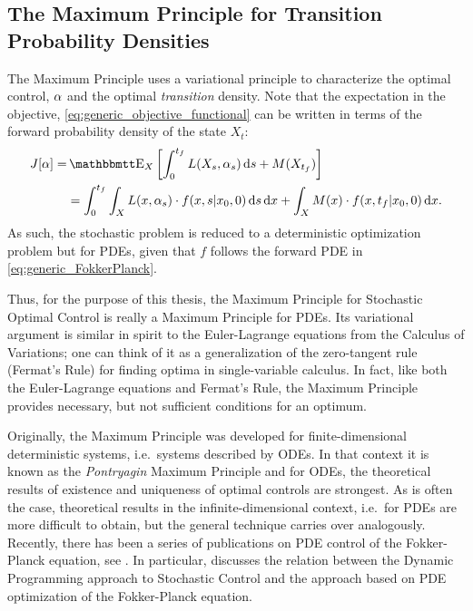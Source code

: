 \subsection{The Maximum Principle for Transition Probability Densities}
\label{sec:maximum_principle_4_stochastic_control}
The Maximum Principle uses a variational principle to characterize the optimal
control, $\alpha$ and the optimal {\sl transition } density. Note that the
expectation in the objective, \cref{eq:generic_objective_functional} can be written in terms of the forward
probability density of the state $X_t$:
\begin{align}
J[\a] =&  \Exp_X \left[ \int_0^\tf L(X_s, \a_s) \intd{s} + M(X_\tf) \right]
\notag \\
&=  \int_0^\tf\int_X L(x, \a_s) \cdot f(x,s|x_0,0) \intd{s}\intd{x} 
+ \int_X  M(x)\cdot f(x,\tf|x_0,0)\intd{x}.
\label{eq:generic_objective_functional_in_terms_of_forward_density}
\end{align}
As such, the stochastic problem is reduced to a deterministic optimization
problem but for PDEs, given that $f$ follows the forward PDE in
\cref{eq:generic_FokkerPlanck}. 

Thus, for the purpose of this thesis, the Maximum Principle for Stochastic Optimal
Control is really a Maximum Principle for PDEs. Its variational argument is
similar in spirit to the Euler-Lagrange equations from the Calculus of
Variations; one can think of it as a generalization of the zero-tangent
rule (Fermat's Rule) for finding optima in single-variable calculus. In fact,
like both the Euler-Lagrange equations and Fermat's Rule, the Maximum Principle
provides necessary, but not sufficient conditions for an optimum.

Originally, the Maximum Principle was developed for finite-dimensional
deterministic systems, i.e.\ systems described by ODEs. In that context it is
known as the {\sl Pontryagin} Maximum Principle and for ODEs, the theoretical
results of existence and uniqueness of optimal controls are strongest. 
As is often the case, theoretical results in the infinite-dimensional context,
i.e.\ for PDEs are more difficult to obtain, but the general technique carries
over analogously. Recently, there has been a series of publications on PDE
control of the Fokker-Planck equation, see \cite{Annunziato2010,Annunziato2013,Annunziato2014}.
In particular, \cite{Annunziato2014} discusses the relation between the Dynamic
Programming approach to Stochastic Control and the approach based on PDE
optimization of the Fokker-Planck equation.

